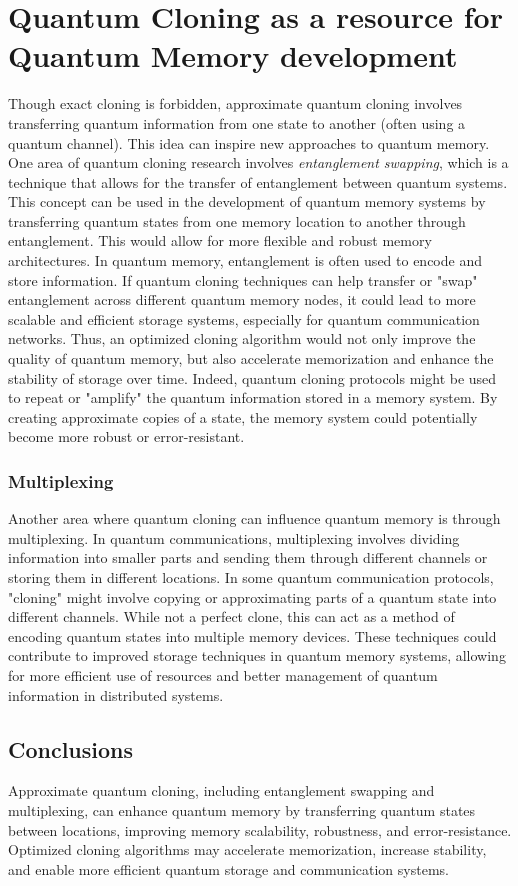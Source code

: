 \documentclass{article}
\theoremstyle{definition}
\theoremstyle{proposition}
\begin{document}
\section{Quantum Cloning as a resource for Quantum Memory development}
Though exact cloning is forbidden, approximate quantum cloning involves transferring quantum information from one state to another (often using a quantum channel). This idea can inspire new approaches to quantum memory.
One area of quantum cloning research involves \textit{entanglement swapping}, which is a technique that allows for the transfer of entanglement between quantum systems. This concept can be used in the development of quantum memory systems by transferring quantum states from one memory location to another through entanglement. This would allow for more flexible and robust memory architectures. In quantum memory, entanglement is often used to encode and store information. If quantum cloning techniques can help transfer or "swap" entanglement across different quantum memory nodes, it could lead to more scalable and efficient storage systems, especially for quantum communication networks.
Thus, an optimized cloning algorithm would not only improve the quality of quantum memory, but also accelerate memorization and enhance the stability of storage over time.
Indeed, quantum cloning protocols might be used to repeat or "amplify" the quantum information stored in a memory system. By creating approximate copies of a state, the memory system could potentially become more robust or error-resistant.

\subsubsection*{Multiplexing}
Another area where quantum cloning can influence quantum memory is through multiplexing. In quantum communications, multiplexing involves dividing information into smaller parts and sending them through different channels or storing them in different locations.
In some quantum communication protocols, "cloning" might involve copying or approximating parts of a quantum state into different channels. While not a perfect clone, this can act as a method of encoding quantum states into multiple memory devices. These techniques could contribute to improved storage techniques in quantum memory systems, allowing for more efficient use of resources and better management of quantum information in distributed systems.

\subsection*{Conclusions}
Approximate quantum cloning, including entanglement swapping and multiplexing, can enhance quantum memory by transferring quantum states between locations, improving memory scalability, robustness, and error-resistance. Optimized cloning algorithms may accelerate memorization, increase stability, and enable more efficient quantum storage and communication systems.
\end{document}
